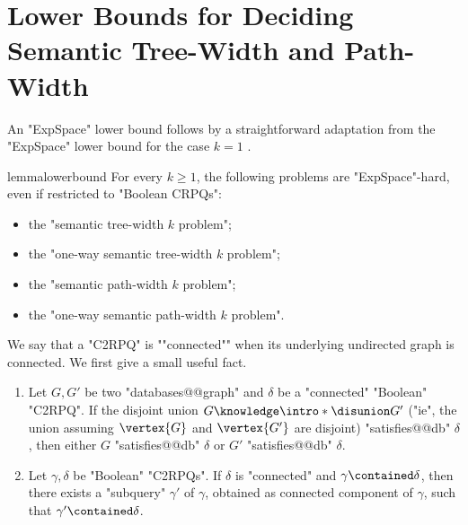 

\section{\AP{}Lower Bounds for Deciding Semantic Tree-Width and Path-Width}
\label{sec:lowerbound}

An "ExpSpace" lower bound follows by a straightforward adaptation from the
"ExpSpace" lower bound for the case $k=1$ \cite[Proposition 6.2]{BarceloRomeroVardi2016SemanticAcyclicity}.
\begin{restatable}{lemma}{lowerbound}
    \AP\label{lemma:lowerbound}
    For every $k\geq 1$, the following problems are "ExpSpace"-hard, even if restricted to "Boolean CRPQs":
	\begin{itemize}
		\item the "semantic tree-width $k$ problem";
		\item the "one-way semantic tree-width $k$ problem";
		\item the "semantic path-width $k$ problem";
		\item the "one-way semantic path-width $k$ problem".
	\end{itemize}
\end{restatable}

\AP We say that a "C2RPQ" is ""connected"" when its underlying undirected graph is connected.
We first give a small useful fact.

\begin{fact}
    \AP\label{fact:connectedness}\leavevmode
    \begin{enumerate}
        \item Let $G, G'$ be two "databases@@graph" and $\delta$ be a "connected" "Boolean" "C2RPQ".
            If the disjoint union $G \AP\intro*\disunion G'$ ("ie", the union assuming $\vertex{G}$ and $\vertex{G'}$ are disjoint) "satisfies@@db" $\delta$, then either $G$ "satisfies@@db" $\delta$ or
            $G'$ "satisfies@@db" $\delta$.
        \item Let $\gamma,\delta$ be "Boolean" "C2RPQs". If $\delta$ is "connected"
            and $\gamma \contained \delta$, then there exists a "subquery" $\gamma'$ of $\gamma$,
            obtained as connected component of $\gamma$, such that
            $\gamma' \contained \delta$. 
    \end{enumerate}
\end{fact}

